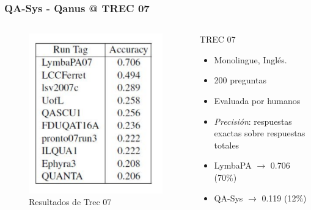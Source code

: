 \begin{frame}
\frametitle{QA-Sys - Qanus @ TREC 07}
\begin{columns}[T] %
\begin{column}{.48\textwidth}
  \begin{figure}
      \includegraphics[scale=0.5]{graficos/trec-7-accuracy-reduced}
    \caption{Resultados de Trec 07}
    \label{fig:tareas}
  \end{figure}
\end{column}%
\hfill%
\begin{column}{.48\textwidth}

  \begin{block}{TREC 07}
      \begin{itemize}
          \item Monolingue, Inglés. %
          \item 200 preguntas
          \item Evaluada por humanos
          \item \textit{Precisión}: respuestas exactas sobre respuestas totales
          \item LymbaPA $\rightarrow$ {\color{blue}0.706} (70\%)
          \item QA-Sys $\rightarrow$ {\color{blue}0.119} (12\%)
        \end{itemize}
  \end{block}
\end{column}%
\end{columns}

\end{frame}


